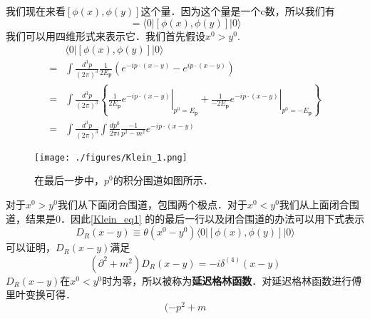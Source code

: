 
我们现在来看$[\phi(x),\phi(y)]$这个量．因为这个量是一个c数，所以我们有
\begin{equation}
[\phi(x),\phi(y)] = \langle 0 | [\phi(x),\phi(y)] | 0 \rangle
\end{equation}
我们可以用四维形式来表示它．我们首先假设$x^0>y^0$.
\begin{equation}\label{Klein_eq1}
\begin{aligned}
& \langle 0|[\phi(x), \phi(y)]| 0\rangle\\
=&\int \frac{d^{3} p}{(2 \pi)^{3}} \frac{1}{2 E_{\mathbf{p}}}\left(e^{-i p \cdot(x-y)}-e^{i p \cdot(x-y)}\right) \\ 
=& \int \frac{d^{3} p}{(2 \pi)^{3}}\left\{\left.\frac{1}{2 E_{\mathbf{p}}} e^{-i p \cdot(x-y)}\right|_{p^{0}=E_{\mathbf{p}}}+\left.\frac{1}{-2 E_{\mathbf{p}}} e^{-i p \cdot(x-y)}\right|_{p^{0}=-E_{\mathbf{p}}}\right\} \\
=& \int \frac{d^{3} p}{(2 \pi)^{3}} \int \frac{d p^{0}}{2 \pi i} \frac{-1}{p^{2}-m^{2}} e^{-i p \cdot(x-y)} 
\end{aligned}
\end{equation}
\begin{figure}[ht]
\centering
\texttt{[image: ./figures/Klein\_1.png]}
\caption{在最后一步中，$p^0$的积分围道如图所示．} \label{Klein_fig1}
\end{figure}
对于$x^0>y^0$我们从下面闭合围道，包围两个极点．对于$x^0<y^0$我们从上面闭合围道，结果是0．因此\autoref{Klein_eq1} 的的最后一行以及闭合围道的办法可以用下式表示
\begin{equation}
D_R(x-y)\equiv \theta(x^0-y^0)\langle 0 | [\phi(x),\phi(y)]|0 \rangle
\end{equation}
可以证明，$D_R(x-y)$满足
\begin{equation}
(\partial^2+m^2)D_R(x-y) = -i \delta^{(4)}(x-y)
\end{equation}
$D_R(x-y)$在$x^0<y^0$时为零，所以被称为\textbf{延迟格林函数}．对延迟格林函数进行傅里叶变换可得．
\begin{equation}
(-p^2+m
\end{equation}

